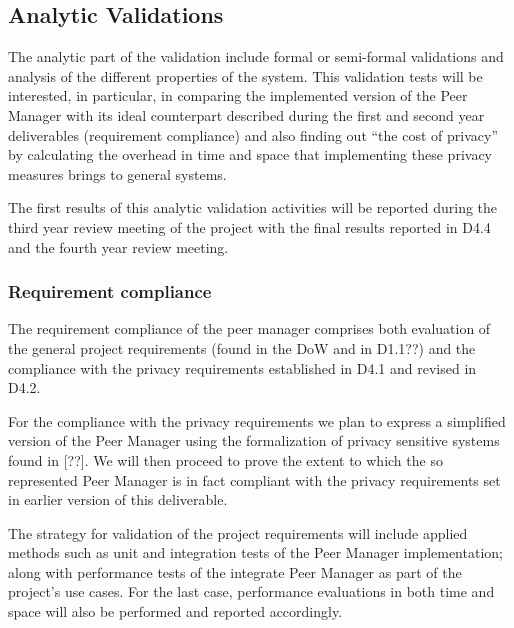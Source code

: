 
  
  


\subsection{Analytic Validations}
The analytic part of the validation include formal or semi-formal validations and analysis of the different properties of the system. This validation tests will be interested, in particular, in comparing the implemented version of the Peer Manager with its ideal counterpart described during the first and second year deliverables (requirement compliance) and also finding out ``the cost of privacy'' by calculating the overhead in time and space that implementing these privacy measures brings to general systems.

The first results of this analytic validation activities will be reported during the third year review meeting of the project with the final results reported in D4.4 and the fourth year review meeting.

\subsubsection{Requirement compliance}
The requirement compliance of the peer manager comprises both evaluation of the general project requirements (found in the DoW and in D1.1??) and the compliance with the privacy requirements established in D4.1 and revised in D4.2.

For the compliance with the privacy requirements we plan to express a simplified version of the Peer Manager using the formalization of privacy sensitive systems found in [??]. We will then proceed to prove the extent to which the so represented Peer Manager is in fact compliant with the privacy requirements set in earlier version of this deliverable. 

The strategy for validation of the project requirements will include applied methods such as unit and integration tests of the Peer Manager implementation; along with performance tests of the integrate Peer Manager as part of the project's use cases. For the last case, performance evaluations in both time and space will also be performed and reported accordingly.  

